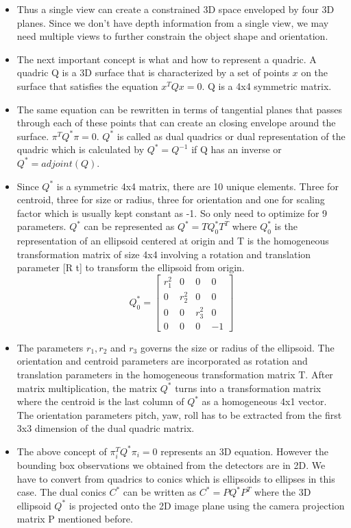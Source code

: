 \documentclass{article}
\begin{document}
\begin{itemize}
\item Thus a single view can create a constrained 3D space enveloped by four 3D planes. Since we don't have depth information from a single view, we may need multiple views to further constrain the object shape and orientation.
\item The next important concept is what and how to represent a quadric. A quadric Q is a 3D surface that is characterized by a set of points $x$ on the surface that satisfies the equation $x^{T}Qx = 0$. Q is a 4x4 symmetric matrix.
\item The same equation can be rewritten in terms of tangential planes that passes through each of these points that can create an closing envelope around the surface. $\pi^{T}Q^{*}\pi = 0$. $Q^{*}$ is called as dual quadrics or dual representation of the quadric which is calculated by $Q^{*} = Q^{-1}$ if Q has an inverse or $Q^{*} = adjoint(Q)$.
\item Since $Q^{*}$ is a symmetric 4x4 matrix, there are 10 unique elements. Three for centroid, three for size or radius, three for orientation and one for scaling factor which is usually kept constant as -1. So only need to optimize for 9 parameters. $Q^{*}$ can be represented as $Q^{*} = T Q^{*}_{0} T^{T}$ where $Q^{*}_{0}$ is the representation of an ellipsoid centered at origin and T is the homogeneous transformation matrix of size 4x4 involving a rotation and translation parameter [R t] to transform the ellipsoid from origin.
$$
 Q^{*}_{0}
 =
  \begin{bmatrix}
   r_1^2 & 0 & 0 & 0 \\
   0 & r_2^2 & 0 & 0 \\
   0 & 0 & r_3^2 & 0 \\
   0 & 0 & 0 & -1
   \end{bmatrix}
$$
\item The parameters $r_1, r_2$ and $r_3$ governs the size or radius of the ellipsoid. The orientation and centroid parameters are incorporated as rotation and translation parameters in the homogeneous transformation matrix T. After matrix multiplication, the matrix $Q^{*}$ turns into a transformation matrix where the centroid is the last column of $Q^{*}$ as a homogeneous 4x1 vector. The orientation parameters pitch, yaw, roll has to be extracted from the first 3x3 dimension of the dual quadric matrix.
\item The above concept of $\pi_{i}^{T}Q^{*}\pi_{i} = 0$ represents an 3D equation. However the bounding box observations we obtained from the detectors are in 2D. We have to convert from quadrics to conics which is ellipsoids to ellipses in this case. The dual conics $C^{*}$ can be written as $C^{*} = P Q^{*} P^{T}$ where the 3D ellipsoid $Q^{*}$ is projected onto the 2D image plane using the camera projection matrix P mentioned before.

\end{itemize}
\end{document}
